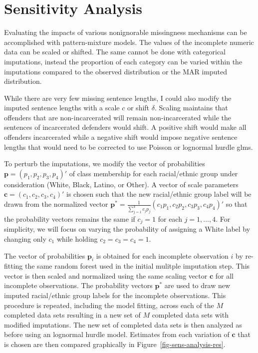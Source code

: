 \documentclass[
  letterpaper,
  DIV=11,
  numbers=noendperiod]{scrartcl}
\begin{document}
\hypertarget{sensitivity-analysis}{%
\section{Sensitivity Analysis}\label{sensitivity-analysis}}

Evaluating the impacts of various nonignorable missingness mechanisms
can be accomplished with pattern-mixture models. The values of the
incomplete numeric data can be scaled or shifted. The same cannot be
done with categorical imputations, instead the proportion of each
category can be varied within the imputations compared to the observed
distribution or the MAR imputed distribution.

While there are very few missing sentence lengths, I could also modify
the imputed sentence lengths with a scale \(c\) or shift \(\delta\).
Scaling maintains that offenders that are non-incarcerated will remain
non-incarcerated while the sentences of incarcerated defenders would
shift. A positive shift would make all offenders incarcerated while a
negative shift would impose negative sentence lengths that would need to
be corrected to use Poisson or lognormal hurdle glms.

To perturb the imputations, we modify the vector of probabilities
\(\mathbf{p} = (p_1, p_2, p_3, p_4)'\) of class membership for each
racial/ethnic group under consideration (White, Black, Latino, or
Other). A vector of scale parameters
\(\mathbf{c} = (c_1, c_2, c_3, c_4)'\) is chosen such that the new
racial/ethnic group label will be drawn from the normalized vector
\(\mathbf{p}^* = \frac{1}{\sum_{j=1}^4 c_j p_j} (c_1 p_1, c_2 p_2, c_3 p_3, c_4 p_4)'\)
so that the probability vectors remains the same if \(c_j = 1\) for each
\(j = 1,\dots,4.\) For simplicity, we will focus on varying the
probability of assigning a White label by changing only \(c_1\) while
holding \(c_2 = c_3 = c_4 = 1.\)

The vector of probabilities \(\mathbf{p}_i\) is obtained for each
incomplete observation \(i\) by re-fitting the same random forest used
in the initial mulitple imputation step. This vector is then scaled and
normalized using the same scaling vector \(\mathbf{c}\) for all
incomplete observations. The probability vectors \(\mathbf{p}^*\) are
used to draw new imputed racial/ethnic group labels for the incomplete
observations. This procedure is repeated, including the model fitting,
across each of the \(M\) completed data sets resulting in a new set of
\(M\) completed data sets with modified imputations. The new set of
completed data sets is then analyzed as before using an lognormal hurdle
model. Estimates from each variation of \(\mathbf{c}\) that is chosen
are then compared graphically in Figure~\ref{fig-sens-analysis-res}.
\end{document}
